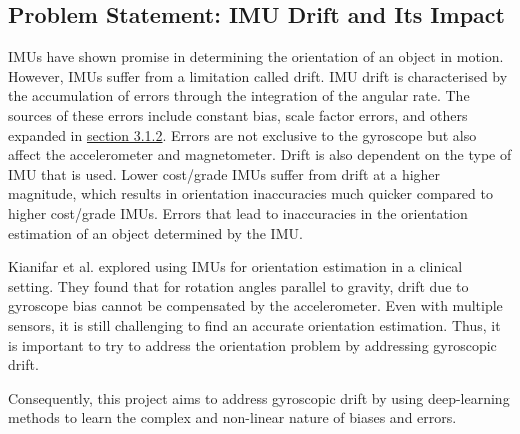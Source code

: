 \subsection{Problem Statement: IMU Drift and Its Impact}
\label{sec:problem}
IMUs have shown promise in determining the orientation of an object in motion. However, IMUs 
suffer from a limitation called drift. IMU drift is characterised by the accumulation of errors
through the integration of the angular rate. The sources of these
errors include constant bias, scale factor errors, and others expanded in \hyperref[sec:gyroerrors]{section 3.1.2}. 
Errors are  not exclusive to the gyroscope but also affect the accelerometer and magnetometer.
Drift is also dependent on the type of IMU that is used.
Lower cost/grade IMUs suffer from drift at a higher magnitude, which results in orientation 
inaccuracies much quicker compared to higher cost/grade IMUs.  
Errors that lead to inaccuracies in the orientation estimation of an object determined by the 
IMU. 

Kianifar et al. explored using IMUs for orientation estimation in a clinical 
setting. They found that for rotation angles parallel to gravity, drift due to gyroscope bias
cannot be compensated by the accelerometer\cite{kianifar_2019_inertial}. Even with multiple sensors, it is still challenging to find an accurate
orientation estimation. Thus, it is important to try to address the orientation problem by addressing 
gyroscopic drift. 

Consequently, this project aims to address gyroscopic drift by using deep-learning methods to learn
the complex and non-linear nature of biases and errors. 

